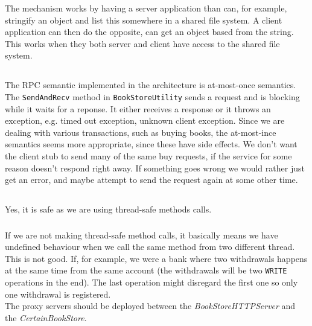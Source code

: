 \documentclass[a4paper]{article}
\begin{document}
\subsubsection{}
The mechanism works by having a server application than can, for example, stringify an object and list this somewhere in a shared file system. A client application can then do the opposite, can get an object based from the string. This works when they both server and client have access to the shared file system.

\subsection{}
The RPC semantic implemented in the architecture is at-most-once semantics. The \texttt{SendAndRecv} method in \texttt{BookStoreUtility} sends a request and is blocking while it waits for a reponse. It either receives a response or it throws an exception, e.g. timed out exception, unknown client exception.
Since we are dealing with various transactions, such as buying books, the at-most-ince semantics seems more appropriate, since these have side effects. We don't want the client stub to send many of the same buy requests, if the service for some reason doesn't respond right away. If something goes wrong we would rather just get an error, and maybe attempt to send the request again at some other time.

\subsection{}
\subsubsection{}
Yes, it is safe as we are using thread-safe methods calls.

\subsubsection{}
If we are not making thread-safe method calls, it basically means we have undefined behaviour when we call the same method from two different thread. This is not good. If, for example, we were a bank where two withdrawals happens at the same time from the same account (the withdrawals will be two \texttt{WRITE} operations in the end). The last operation might disregard the first one so only one withdrawal is registered. \\
The proxy servers should be deployed between the \textit{BookStoreHTTPServer} and the \textit{CertainBookStore}.
\end{document}
